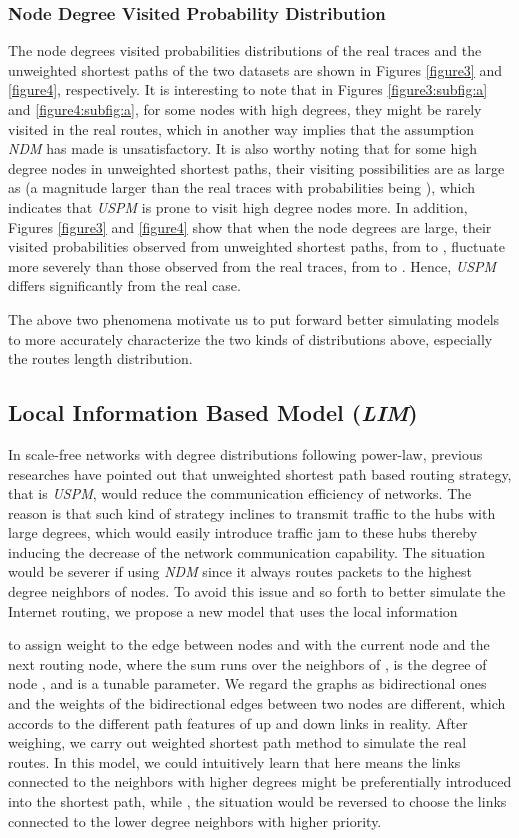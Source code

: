 \documentclass[a4paper]{llncs}
\begin{document}
\subsubsection{Node Degree Visited Probability Distribution}
The node degrees visited probabilities distributions of the real
traces and the unweighted shortest paths of the two
datasets are shown in Figures \ref{figure3} and \ref{figure4},
respectively. It is interesting to note that in Figures
\ref{figure3:subfig:a} and \ref{figure4:subfig:a}, for some nodes
with high degrees, they might be rarely visited in the real routes,
which in another way implies that the assumption \textit{NDM} has made is unsatisfactory. It is also worthy noting that for some high degree nodes in unweighted shortest paths, their visiting possibilities are as large as  (a magnitude larger than the real traces with probabilities being ), which indicates that \textit{USPM} is prone to visit high degree nodes more. In
addition, Figures \ref{figure3} and \ref{figure4}
show that when the node degrees are large, their visited probabilities observed from unweighted shortest paths, from 
to , fluctuate more severely than those observed from the
real traces, from  to . Hence, \textit{USPM} differs significantly from the real case.

The above two phenomena motivate us to put forward better simulating models to more accurately characterize the two kinds of distributions above, especially the routes length distribution. 
\subsection{Local Information Based Model (\textit{LIM})}
In scale-free networks with degree distributions following
power-law, previous researches \cite{TrafficDynamicLocal,EfficientRouting}
have pointed out that unweighted shortest path based routing
strategy, that is \textit{USPM}, would reduce the communication
efficiency of networks. The reason is that such kind of strategy inclines to transmit traffic to the hubs with large degrees, which would easily introduce traffic jam to these hubs thereby inducing the decrease of the network communication capability. The situation would be severer if using \textit{NDM} since it always routes packets to the highest degree neighbors of nodes. To avoid this issue and so forth to better simulate the Internet routing, we propose a new model that uses the local information

to assign weight to the edge between nodes  and  with  the current node and  the next routing node, where the sum runs over the neighbors of ,  is the degree of node , and  is a tunable parameter. We regard the graphs as bidirectional ones and
the weights of the bidirectional edges between two nodes are different, which accords to the different path features of up and down links in reality. After weighing, we carry out weighted shortest path method to simulate the real routes. In this model,
we could intuitively learn that here  means the links connected to the neighbors with
higher degrees might be preferentially introduced into the shortest
path, while , the situation would be reversed to choose the links connected to the lower degree neighbors with higher priority.
\end{document}
